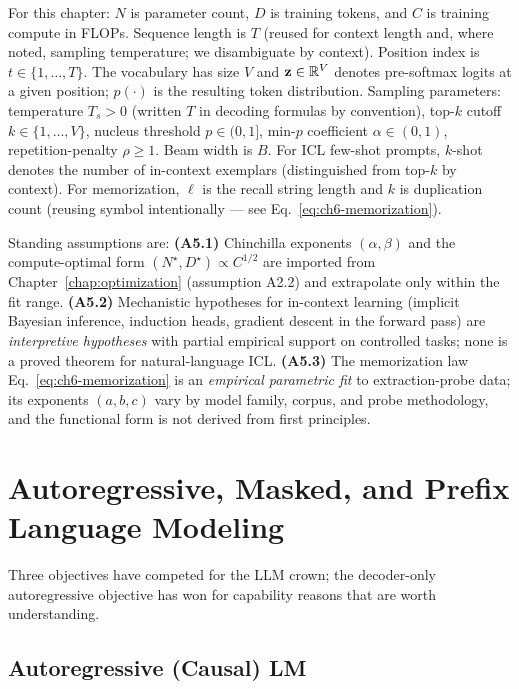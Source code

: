 \begin{notationbox}
For this chapter: $N$ is parameter count, $D$ is training tokens, and
$C$ is training compute in FLOPs. Sequence length is $T$ (reused for
context length and, where noted, sampling temperature; we disambiguate
by context). Position index is $t \in \{1, \ldots, T\}$. The
vocabulary has size $V$ and $\mathbf{z} \in \mathbb{R}^{V}$ denotes pre-softmax
logits at a given position; $p(\cdot)$ is the resulting token
distribution. Sampling parameters: temperature $T_s > 0$ (written $T$
in decoding formulas by convention), top-$k$ cutoff
$k \in \{1, \ldots, V\}$, nucleus threshold $p \in (0, 1]$, min-$p$
coefficient $\alpha \in (0, 1)$, repetition-penalty $\rho \ge 1$.
Beam width is $B$. For ICL few-shot prompts, $k$-shot denotes the
number of in-context exemplars (distinguished from top-$k$ by
context). For memorization, $\ell$ is the recall string length and
$k$ is duplication count (reusing symbol intentionally — see
Eq.~\eqref{eq:ch6-memorization}).

Standing assumptions are:
\textbf{(A5.1)} Chinchilla exponents $(\alpha, \beta)$ and the
compute-optimal form $(N^\star, D^\star) \propto C^{1/2}$ are imported
from Chapter~\ref{chap:optimization} (assumption A2.2) and extrapolate only within the fit
range.
\textbf{(A5.2)} Mechanistic hypotheses for in-context learning
(implicit Bayesian inference, induction heads, gradient descent in
the forward pass) are \emph{interpretive hypotheses} with partial
empirical support on controlled tasks; none is a proved theorem for
natural-language ICL.
\textbf{(A5.3)} The memorization law Eq.~\eqref{eq:ch6-memorization}
is an \emph{empirical parametric fit} to extraction-probe data; its
exponents $(a, b, c)$ vary by model family, corpus, and probe
methodology, and the functional form is not derived from first
principles.
\end{notationbox}

\section{Autoregressive, Masked, and Prefix Language Modeling}

Three objectives have competed for the LLM crown; the decoder-only
autoregressive objective has won for capability reasons that are
worth understanding.

\subsection{Autoregressive (Causal) LM}

